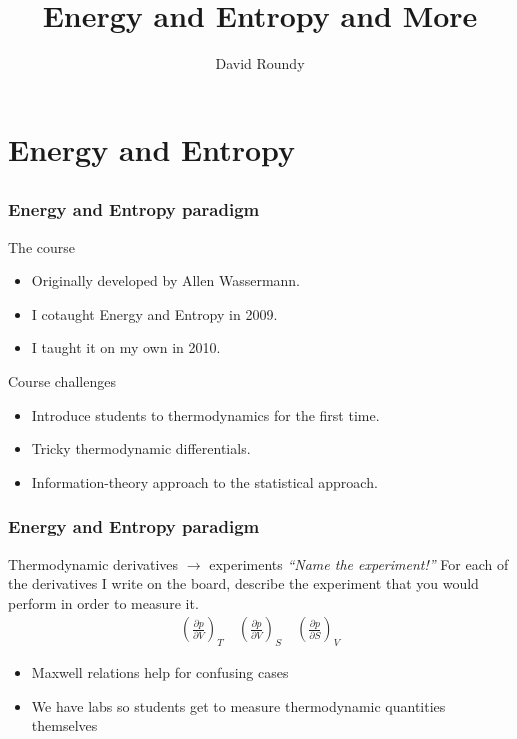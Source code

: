 \documentclass{beamer}
\title{Energy and Entropy and More}
\author{David Roundy}
\institute{Oregon State University}
\date{}
\begin{document}
\begin{frame}
  \titlepage
\end{frame}


\section{Energy and Entropy}
\subsection*{}

\begin{frame}
  \frametitle{Energy and Entropy paradigm}
  \begin{block}{The course}
    \begin{itemize}
    \item Originally developed by Allen Wassermann.
    \item I cotaught Energy and Entropy in 2009.
    \item I taught it on my own in 2010.
    \end{itemize}
  \end{block}
  \vfill
  \begin{block}{Course challenges}
    \begin{itemize}
    \item Introduce students to thermodynamics for the first time.
    \item Tricky thermodynamic differentials.
    \item Information-theory approach to the statistical approach.
    \end{itemize}
  \end{block}
\end{frame}

\newcommand\myderiv[3]{%
  \ensuremath{\left(\frac{\partial #1}{\partial #2}\right)_{#3}}}

\begin{frame}
  \frametitle{Energy and Entropy paradigm}
  \begin{block}{Thermodynamic derivatives $\longrightarrow$ experiments}
    \emph{``Name the experiment!''} For each of the derivatives I
    write on the board, describe the experiment that you would perform
    in order to measure it.
    \begin{align}
      \myderiv{p}{V}{T} \quad
      \myderiv{p}{V}{S} \quad
      \myderiv{p}{S}{V}
    \end{align}
    \begin{itemize}
    \item Maxwell relations help for confusing cases
    \item We have labs so students get to measure thermodynamic
      quantities themselves
    \end{itemize}
  \end{block}
\end{frame}
\end{document}
